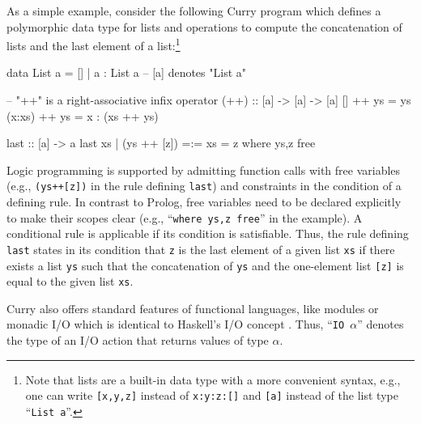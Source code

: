 \documentclass[english]{lni}
\newcommand{\code}[1]{\texttt{\small{}#1}}
\newcommand{\ccode}[1]{``\code{#1}''}
\begin{document}
As a simple example, consider the following Curry program
which defines a polymorphic 
data type for lists and operations to compute the 
concatenation of lists and the last element of a list:\footnote{Note
that lists are a built-in data type with a more convenient syntax, 
e.g., one can write \code{[x,y,z]} instead of \code{x:y:z:[]}
and \code{[a]} instead of the list type \ccode{List a}.}
%
\begin{curry}
data List a = [] | a : List a    -- [a] denotes "List a"

-- "++" is a right-associative infix operator
(++) :: [a] -> [a] -> [a]
[]     ++ ys = ys
(x:xs) ++ ys = x : (xs ++ ys)

last :: [a] -> a
last xs | (ys ++ [z]) =:= xs
        = z                    where ys,z free
\end{curry}
%
Logic programming is supported by admitting function calls with free
variables (e.g., \code{(ys++[z])} in the rule defining \code{last})
and constraints in the condition of a defining rule. In contrast to
Prolog, free variables need to be declared explicitly to make their
scopes clear (e.g., \ccode{where ys,z free} in the example).
A conditional rule is applicable if its condition  is satisfiable.
Thus, the rule defining \code{last} states in its condition
that \code{z} is the last element of a given list
\code{xs} if there exists a list \code{ys}
such that the concatenation of \code{ys} and the one-element list
\code{[z]} is equal to the given list \code{xs}.

Curry also offers standard features of
functional languages, like modules or monadic I/O
which is identical to Haskell's I/O concept \cite{Wadler97}.
Thus, \ccode{IO $\alpha$} denotes the type of an I/O action that returns values
of type $\alpha$.
\end{document}
